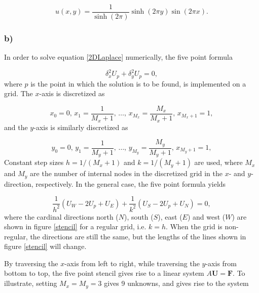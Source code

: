 \begin{equation}
    u(x,y) = \frac{1}{\sinh{(2\pi)}}\sinh{(2\pi y)}\sin{(2\pi x)}. 
\end{equation}

\subsubsection{b)}

In order to solve equation \eqref{2DLaplace} numerically, the five point formula 

\begin{equation}
    \delta_x^2U_p + \delta_y^2U_p = 0, 
    \label{fivePointFormula}
\end{equation}
where $p$ is the point in which the solution is to be found, is implemented on a grid. The $x$-axis is discretized as 

\begin{equation*}
    x_0 = 0, \, x_1 = \frac{1}{M_x+1}, \, \dots, \, x_{M_x} = \frac{M_x}{M_x+1}, \, x_{M_x+1} = 1,
\end{equation*}
and the $y$-axis is similarly discretized as 

\begin{equation*}
    y_0 = 0, \, y_1 = \frac{1}{M_y+1}, \, \dots, \, y_{M_y} = \frac{M_y}{M_y+1}, \, x_{M_y+1} = 1,
\end{equation*}
Constant step sizes $h = 1/(M_x+1)$ and $k = 1/(M_y+1)$ are used, where $M_x$ and $M_y$ are the number of internal nodes in the discretized grid in the $x$- and $y$-direction, respectively. In the general case, the five point formula yields

\begin{equation*}
    \frac{1}{h^2}(U_W - 2U_p + U_E) + \frac{1}{k^2}(U_S - 2U_p + U_N) = 0, 
\end{equation*}
where the cardinal directions north ($N$), south ($S$), east ($E$) and west ($W$) are shown in figure \ref{stencil} for a regular grid, i.e. $k = h$. When the grid is non-regular, the directions are still the same, but the lengths of the lines shown in figure \ref{stencil} will change. 

By traversing the $x$-axis from left to right, while traversing the $y$-axis from bottom to top, the five point stencil gives rise to a linear system $A\boldsymbol{U} = \boldsymbol{F}$. To illustrate, setting $M_x = M_y = 3$ gives 9 unknowns, and gives rise to the system 

